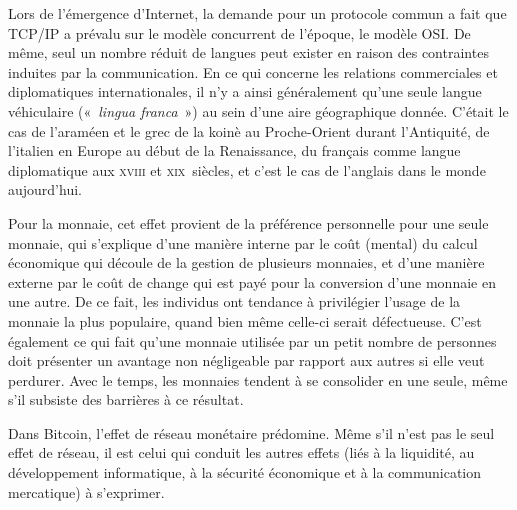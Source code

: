 Lors de l'émergence d'Internet, la demande pour un protocole commun a fait que TCP/IP a prévalu sur le modèle concurrent de l'époque, le modèle OSI. De même, seul un nombre réduit de langues peut exister en raison des contraintes induites par la communication. En ce qui concerne les relations commerciales et diplomatiques internationales, il n'y a ainsi généralement qu'une seule langue véhiculaire («~\emph{lingua franca}~») au sein d'une aire géographique donnée. C'était le cas de l'araméen et le grec de la koinè au Proche-Orient durant l'Antiquité, de l'italien en Europe au début de la Renaissance, du français comme langue diplomatique aux \textsc{xviii}\ieme{} et \textsc{xix}\ieme{}~siècles, et c'est le cas de l'anglais dans le monde aujourd'hui.

Pour la monnaie, cet effet provient de la préférence personnelle pour une seule monnaie, qui s'explique d'une manière interne par le coût (mental) du calcul économique qui découle de la gestion de plusieurs monnaies, et d'une manière externe par le coût de change qui est payé pour la conversion d'une monnaie en une autre. De ce fait, les individus ont tendance à privilégier l'usage de la monnaie la plus populaire, quand bien même celle-ci serait défectueuse. C'est également ce qui fait qu'une monnaie utilisée par un petit nombre de personnes doit présenter un avantage non négligeable par rapport aux autres si elle veut perdurer. Avec le temps, les monnaies tendent à se consolider en une seule, même s'il subsiste des barrières à ce résultat.

Dans Bitcoin, l'effet de réseau monétaire prédomine. Même s'il n'est pas le seul effet de réseau, il est celui qui conduit les autres effets (liés à la liquidité, au développement informatique, à la sécurité économique et à la communication mercatique) à s'exprimer.

